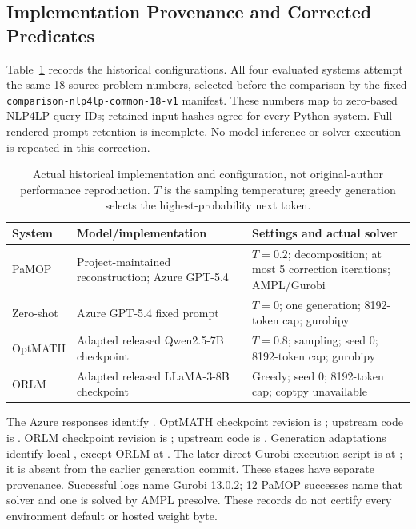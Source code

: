 \subsection{Implementation Provenance and Corrected Predicates}
Table~\ref{tab:llm-provenance} records the historical configurations.
All four evaluated systems attempt the same 18 source problem numbers, selected before the comparison by the fixed \texttt{comparison-nlp4lp-common-18-v1} manifest. These numbers map to zero-based NLP4LP query IDs; retained input hashes agree for every Python system. Full rendered prompt retention is incomplete. No model inference or solver execution is repeated in this correction.

\begin{table}[htbp]\centering\small
\caption{Actual historical implementation and configuration, not original-author performance reproduction. $T$ is the sampling temperature; greedy generation selects the highest-probability next token.}\label{tab:llm-provenance}
\begin{tabularx}{\linewidth}{@{}lXX@{}}\toprule
System & Model/implementation & Settings and actual solver\\\midrule
PaMOP & Project-maintained reconstruction; Azure GPT-5.4 & $T=0.2$; decomposition; at most 5 correction iterations; AMPL/Gurobi\\
Zero-shot & Azure GPT-5.4 fixed prompt & $T=0$; one generation; 8192-token cap; gurobipy\\
OptMATH & Adapted released Qwen2.5-7B checkpoint & $T=0.8$; sampling; seed 0; 8192-token cap; gurobipy\\
ORLM & Adapted released LLaMA-3-8B checkpoint & Greedy; seed 0; 8192-token cap; coptpy unavailable\\\bottomrule
\end{tabularx}\end{table}
The Azure responses identify . OptMATH checkpoint revision is ; upstream code is . ORLM checkpoint revision is ; upstream code is . Generation adaptations identify local , except ORLM at . The later direct-Gurobi execution script is at ; it is absent from the earlier generation commit. These stages have separate provenance. Successful logs name Gurobi 13.0.2; 12 PaMOP successes name that solver and one is solved by AMPL presolve. These records do not certify every environment default or hosted weight byte.

